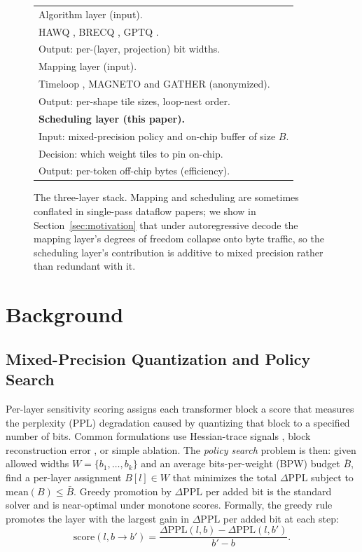\documentclass{ieeeaccess}
\begin{document}
\begin{figure}[t]
\centering
\begin{tabular}{|l|}
\hline
\textsf{Algorithm layer (input).} \\
HAWQ \cite{dong2019hawq}, BRECQ \cite{li2021brecq}, GPTQ \cite{frantar2023gptq}. \\
Output: per-(layer, projection) bit widths. \\ \hline
\textsf{Mapping layer (input).} \\
Timeloop \cite{parashar2019timeloop}, MAGNETO and GATHER (anonymized). \\
Output: per-shape tile sizes, loop-nest order. \\ \hline
\textbf{\textsf{Scheduling layer (this paper).}} \\
Input: mixed-precision policy and on-chip buffer of size $B$. \\
Decision: which weight tiles to pin on-chip. \\
Output: per-token off-chip bytes (efficiency). \\ \hline
\end{tabular}
\caption{The three-layer stack. Mapping and scheduling are sometimes
conflated in single-pass dataflow papers; we show in
Section~\ref{sec:motivation} that under autoregressive decode the
mapping layer's degrees of freedom collapse onto byte traffic, so the
scheduling layer's contribution is additive to mixed precision rather
than redundant with it.}
\label{fig:stack}
\end{figure}

\section{Background}
\label{sec:background}

\subsection{Mixed-Precision Quantization and Policy Search}
Per-layer sensitivity scoring assigns each transformer block a score
that measures the perplexity (PPL) degradation caused by quantizing
that block to a specified number of bits. Common formulations use
Hessian-trace signals \cite{dong2019hawq, dong2020hawqv2}, block
reconstruction error \cite{li2021brecq}, or simple ablation. The
\emph{policy search} problem is then: given allowed widths
$W = \{b_1,\ldots,b_k\}$ and an average bits-per-weight (BPW) budget
$\bar{B}$, find a per-layer assignment $B[l] \in W$ that minimizes the
total $\Delta \mathrm{PPL}$ subject to $\mathrm{mean}(B) \le \bar{B}$.
Greedy promotion by $\Delta \mathrm{PPL}$ per added bit is the standard
solver and is near-optimal under monotone scores. Formally, the greedy
rule promotes the layer with the largest gain in $\Delta \mathrm{PPL}$
per added bit at each step:
\begin{equation}
\mathrm{score}(l, b\!\to\!b') = \frac{\Delta\mathrm{PPL}(l,b) - \Delta\mathrm{PPL}(l,b')}{b' - b}.
\label{eq:greedy_score}
\end{equation}
\end{document}
